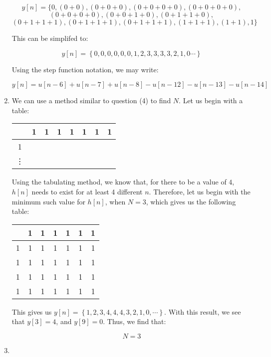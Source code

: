 \begin{enumerate}
    $$y[n]=\{ 0, (0+0), (0+0+0), (0+0+0+0), (0+0+0+0), $$
    $$(0+0+0+0), (0+0+1+0), (0+1+1+0), $$
    $$(0+1+1+1), (0+1+1+1), (0+1+1+1),(1+1+1), (1+1), 1 \}$$

    This can be simplifed to:

    $$y[n]=\left\{ 0, 0, 0, 0, 0, 0, 1, 2, 3, 3, 3, 3, 2, 1, 0\cdots\right\}$$

    Using the step function notation, we may write:

    $$y[n]=u[n-6]+u[n-7]+u[n-8]-u[n-12]-u[n-13]-u[n-14]$$

  \item

    We can use a method similar to question (4) to find $N$. Let us begin with a table:

    \begin{center}
      \begin{tabular}[H]{c|cccccc}
        & 1 & 1 & 1 & 1 & 1 & 1 & 1\\
         & & & & & & & \\
        \vdots & & & & & & & \\
      \end{tabular}
    \end{center}

    Using the tabulating method, we know that, for there to be a value of $4$, $h[n]$ needs to exist for at least 4 different $n$. Therefore, let us begin with the minimum such value for $h[n]$, when $N=3$, which gives us the following table:

    \begin{center}
      \begin{tabular}[H]{c|cccccc}
        & 1 & 1 & 1 & 1 & 1 & 1 \\
        \hline
        1 & 1 & 1 & 1 & 1 & 1 & 1\\
        1 & 1 & 1 & 1 & 1 & 1 & 1\\
        1 & 1 & 1 & 1 & 1 & 1 & 1 \\
        1 & 1 & 1 & 1 & 1 & 1 & 1 \\
      \end{tabular}
    \end{center}

    This gives us $y[n]=\left\{  1, 2, 3, 4, 4, 4, 3, 2, 1, 0, \cdots\right\}$. With this result, we see that $y[3]=4$, and $y[9]=0$. Thus, we find that:

    $$\boxed{N=3}$$

  \item


\end{enumerate}
